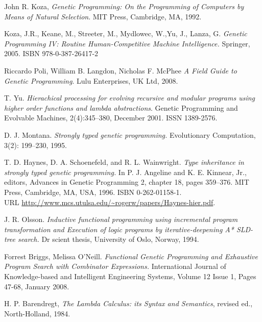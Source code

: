 \documentclass[12pt,a4paper]{report}
\begin{document}
\begin{thebibliography}{9}



  John R. Koza,
  \emph{Genetic Programming: On the Programming of Computers by Means of Natural Selection}.
  MIT Press, Cambridge, MA,
  1992. 

  Koza, J.R., Keane, M., Streeter, M., Mydlowec, W.,Yu, J., Lanza, G. 
  \emph{Genetic Programming IV: Routine Human-Competitive Machine Intelligence.} 
  Springer, 2005. ISBN 978-0-387-26417-2 

 Riccardo Poli, William B. Langdon, Nicholas F. McPhee
 \emph{A Field Guide to Genetic Programming}.
 Lulu Enterprises, UK Ltd, 2008.

  T. Yu. 
  \emph{Hierachical processing for evolving recursive and modular 
        programs using higher order functions and lambda abstractions}. 
  Genetic Programming and Evolvable Machines,
  2(4):345–380, December 2001. ISSN 1389-2576.


D. J. Montana. 
\emph{Strongly typed genetic programming.} 
Evolutionary Computation, 3(2): 199–230, 1995.

T. D. Haynes, D. A. Schoenefeld, and R. L. Wainwright. 
\emph{Type inheritance in strongly typed genetic programming.} 
In P. J. Angeline and K. E. Kinnear, Jr., editors, Advances
in Genetic Programming 2, chapter 18, pages 359–376.
MIT Press, Cambridge, MA, USA, 1996. ISBN 0-262-01158-1.\\ 
URL 
\url{http://www.mcs.utulsa.edu/~rogerw/papers/Haynes-hier.pdf}.


J. R. Olsson. 
\emph{Inductive functional programming using incremental program 
transformation and Execution of logic programs by 
iterative-deepening A* SLD-tree search.} 
Dr scient thesis, University of Oslo, Norway, 1994.

Forrest Briggs, Melissa O’Neill.
\emph{Functional Genetic Programming and Exhaustive
Program Search with Combinator Expressions.}
International Journal of Knowledge-based and Intelligent Engineering Systems,
Volume 12 Issue 1, Pages 47-68, January 2008. 


H. P. Barendregt,
\emph{The Lambda Calculus: its Syntax and Semantics}, 
revised ed., North-Holland, 1984.


\end{thebibliography}
\end{document}
